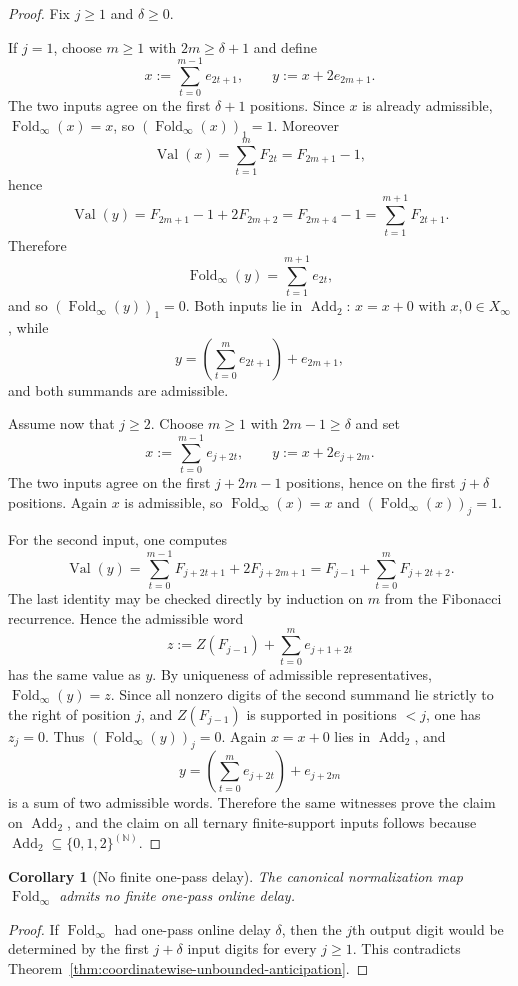 \documentclass[11pt,letterpaper]{article}
\numberwithin{equation}{section}
\theoremstyle{plain}
\newtheorem{corollary}[theorem]{Corollary}
\theoremstyle{definition}
\theoremstyle{remark}
\newcommand{\NN}{\mathbb{N}}
\newcommand{\Xinf}{X_\infty}
\DeclareMathOperator{\Val}{Val}
\DeclareMathOperator{\Fold}{Fold}
\newcommand{\AddTwo}{\operatorname{Add}_{2}}
\begin{document}
\begin{proof}
Fix $j\ge 1$ and $\delta\ge 0$.

If $j=1$, choose $m\ge 1$ with $2m\ge \delta+1$ and define
\[
x:=\sum_{t=0}^{m-1} e_{2t+1},
\qquad
y:=x+2e_{2m+1}.
\]
The two inputs agree on the first $\delta+1$ positions.  Since $x$ is already
admissible, $\Fold_\infty(x)=x$, so $(\Fold_\infty(x))_1=1$.  Moreover
\[
\Val(x)=\sum_{t=1}^{m}F_{2t}=F_{2m+1}-1,
\]
hence
\[
\Val(y)=F_{2m+1}-1+2F_{2m+2}=F_{2m+4}-1=\sum_{t=1}^{m+1}F_{2t+1}.
\]
Therefore
\[
\Fold_\infty(y)=\sum_{t=1}^{m+1} e_{2t},
\]
and so $(\Fold_\infty(y))_1=0$.
Both inputs lie in $\AddTwo$: $x=x+0$ with $x,0\in\Xinf$, while
\[
y=
\left(\sum_{t=0}^{m}e_{2t+1}\right)+e_{2m+1},
\]
and both summands are admissible.

Assume now that $j\ge 2$.  Choose $m\ge 1$ with $2m-1\ge \delta$ and set
\[
x:=\sum_{t=0}^{m-1} e_{j+2t},
\qquad
y:=x+2e_{j+2m}.
\]
The two inputs agree on the first $j+2m-1$ positions, hence on the first
$j+\delta$ positions.  Again $x$ is admissible, so $\Fold_\infty(x)=x$ and
$(\Fold_\infty(x))_j=1$.

For the second input, one computes
\[
\Val(y)
=
\sum_{t=0}^{m-1}F_{j+2t+1}+2F_{j+2m+1}
=
F_{j-1}+\sum_{t=0}^{m}F_{j+2t+2}.
\]
The last identity may be checked directly by induction on $m$ from the
Fibonacci recurrence.
Hence the admissible word
\[
z:=Z(F_{j-1})+\sum_{t=0}^{m} e_{j+1+2t}
\]
has the same value as $y$.  By uniqueness of admissible representatives,
$\Fold_\infty(y)=z$.  Since all nonzero digits of the second summand lie
strictly to the right of position $j$, and $Z(F_{j-1})$ is supported in
positions $<j$, one has $z_j=0$.  Thus $(\Fold_\infty(y))_j=0$.
Again $x=x+0$ lies in $\AddTwo$, and
\[
y=
\left(\sum_{t=0}^{m}e_{j+2t}\right)+e_{j+2m}
\]
is a sum of two admissible words.  Therefore the same witnesses prove the
claim on $\AddTwo$, and the claim on all ternary finite-support inputs follows
because $\AddTwo\subseteq\{0,1,2\}^{(\NN)}$.
\end{proof}

\begin{corollary}[No finite one-pass delay]\label{thm:no-bounded-delay}
The canonical normalization map $\Fold_\infty$ admits no finite one-pass
online delay.
\end{corollary}

\begin{proof}
If $\Fold_\infty$ had one-pass online delay $\delta$, then the $j$th output
digit would be determined by the first $j+\delta$ input digits for every
$j\ge 1$.  This contradicts
Theorem~\ref{thm:coordinatewise-unbounded-anticipation}.
\end{proof}
\end{document}
